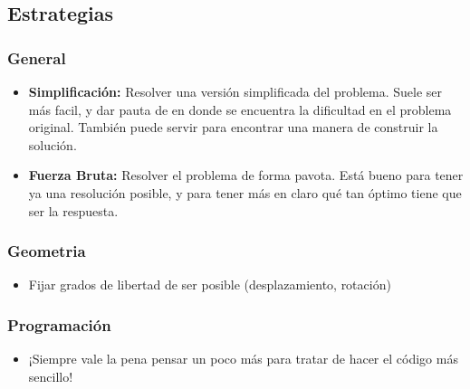
\subsection{Estrategias}

\subsubsection*{General}
\begin{itemize}
    \item \textbf{Simplificación:} Resolver una versión simplificada del problema. Suele ser más facil, y dar pauta de en donde se encuentra la dificultad en el problema original. También puede servir para encontrar una manera de construir la solución.
    \item \textbf{Fuerza Bruta:} Resolver el problema de forma pavota. Está bueno para tener ya una resolución posible, y para tener más en claro qué tan óptimo tiene que ser la respuesta.
\end{itemize}

\subsubsection*{Geometria}
\begin{itemize}
    \item Fijar grados de libertad de ser posible (desplazamiento, rotación)
\end{itemize}


\subsubsection*{Programación}
\begin{itemize}
    \item ¡Siempre vale la pena pensar un poco más para tratar de hacer el código más sencillo!
\end{itemize}
